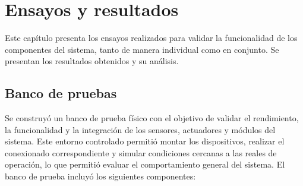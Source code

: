 \chapter{Ensayos y resultados} %

\label{Chapter4}

Este capítulo presenta los ensayos realizados para validar la funcionalidad de
los componentes del sistema, tanto de manera individual como en conjunto. Se
presentan los resultados obtenidos y su análisis.

\section{Banco de pruebas}

Se construyó un banco de prueba físico con el objetivo de validar el
rendimiento, la funcionalidad y la integración de los sensores, actuadores y
módulos del sistema. Este entorno controlado permitió montar los dispositivos,
realizar el conexionado correspondiente y simular condiciones cercanas a las
reales de operación, lo que permitió evaluar el comportamiento general del
sistema. El banco de prueba incluyó los siguientes componentes:

